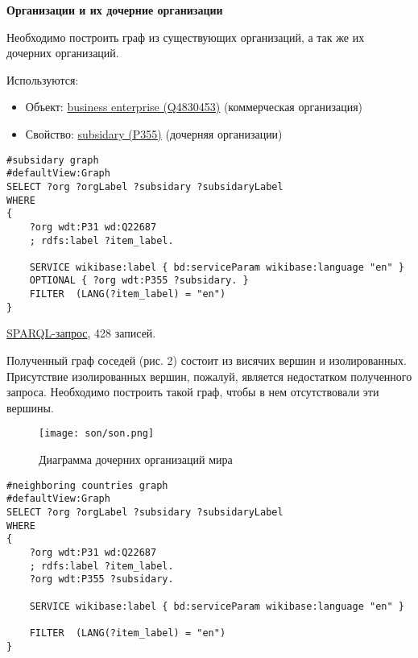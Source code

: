 \textbf{Организации и их дочерние организации}

Необходимо построить граф из существующих организаций, а так же их дочерних организаций.

Используются:
\begin{itemize}
    \item Объект: \href{https://www.wikidata.org/wiki/Q4830453}{business enterprise (Q4830453)} (коммерческая организация)
    \item Свойство: \href{https://www.wikidata.org/wiki/Property:P355}{subsidary (P355)} (дочерняя организации)
\end{itemize}

\begin{lstlisting}[language=SPARQL]
#subsidary graph
#defaultView:Graph
SELECT ?org ?orgLabel ?subsidary ?subsidaryLabel
WHERE
{
    ?org wdt:P31 wd:Q22687
    ; rdfs:label ?item_label.

    SERVICE wikibase:label { bd:serviceParam wikibase:language "en" }
    OPTIONAL { ?org wdt:P355 ?subsidary. }
    FILTER  (LANG(?item_label) = "en") 
}
\end{lstlisting}

\href{https://query.wikidata.org/#%23neighboring%20countries%20graph%0A%23defaultView%3AGraph%0ASELECT%20%3Forg%20%3ForgLabel%20%3Fsubsidary%20%3FsubsidaryLabel%0AWHERE%0A%7B%0A%20%20%20%20%3Forg%20wdt%3AP31%20wd%3AQ22687%0A%20%20%20%20%3B%20rdfs%3Alabel%20%3Fitem_label%20.%0A%0A%20%20%20%20SERVICE%20wikibase%3Alabel%20%7B%20bd%3AserviceParam%20wikibase%3Alanguage%20%22en%22%20%7D%0A%20%20%20%20OPTIONAL%20%7B%20%3Forg%20wdt%3AP355%20%3Fsubsidary%20.%20%7D%0A%20%20%20%20FILTER%20%20%28LANG%28%3Fitem_label%29%20%3D%20%22en%22%29%20%0A%7D%0A}{SPARQL-запрос}, 428 записей.

Полученный граф соседей (рис. 2) состоит из висячих вершин и изолированных. Присутствие изолированных вершин, пожалуй, является недостатком полученного запроса. Необходимо построить такой граф, чтобы в нем отсутствовали эти вершины.

\begin{figure}[h]
	\texttt{[image: son/son.png]}
	\centering
	\caption{Диаграмма дочерних организаций мира}
	\centering
\end{figure}


\begin{lstlisting}[language=SPARQL]
#neighboring countries graph
#defaultView:Graph
SELECT ?org ?orgLabel ?subsidary ?subsidaryLabel
WHERE
{
    ?org wdt:P31 wd:Q22687
    ; rdfs:label ?item_label.
    ?org wdt:P355 ?subsidary. 
  
    SERVICE wikibase:label { bd:serviceParam wikibase:language "en" }

    FILTER  (LANG(?item_label) = "en") 
}
\end{lstlisting}

